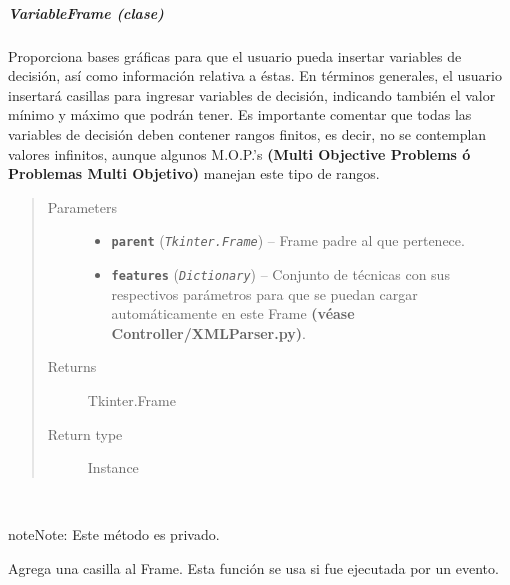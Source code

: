 \documentclass[class=report, crop=false]{standalone}
\begin{document}
\subparagraph{VariableFrame (clase)}
\label{sec:a_3_2_2_1_1}
\begin{fulllineitems}

\begin{DUlineblock}{0em}
\item[] Proporciona bases gráficas para que el usuario pueda insertar
variables de decisión, así como información relativa a éstas.\break
En términos generales, el usuario insertará casillas para ingresar variables
de decisión, indicando también el valor mínimo y máximo que podrán tener.\medskip\break
Es importante comentar que todas las variables de decisión deben contener
rangos finitos, es decir, no se contemplan valores infinitos, aunque algunos
M.O.P.'s \textbf{(Multi Objective Problems ó Problemas Multi Objetivo)} 
manejan este tipo de rangos.         
\end{DUlineblock}

\begin{quote}\begin{description}
\item[{Parameters}] \leavevmode\begin{itemize}
\item \textbf{\texttt{parent}} (\emph{\texttt{Tkinter.Frame}}) -- Frame padre al que pertenece.
\item \textbf{\texttt{features}} (\emph{\texttt{Dictionary}}) -- Conjunto de técnicas con sus respectivos parámetros para que se puedan cargar automáticamente en este Frame \textbf{(véase Controller/XMLParser.py)}.
\end{itemize}

\item[{Returns}] \leavevmode
Tkinter.Frame
\item[{Return type}] \leavevmode
Instance
\end{description}\end{quote}


\begin{fulllineitems}

~
\begin{notice}{note}{Note:}
Este método es privado.
\end{notice}

Agrega una casilla al Frame.\break
Esta función se usa si fue ejecutada por un 
evento.


\end{fulllineitems}
\end{fulllineitems}
\end{document}
